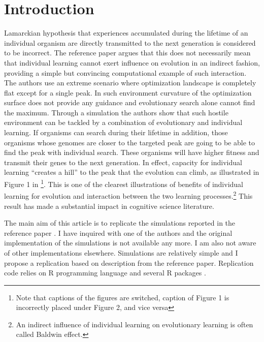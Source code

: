 \documentclass[10pt,a4paper,onecolumn]{article}
\begin{document}
\section{Introduction}\label{introduction}

Lamarckian hypothesis that experiences accumulated during the lifetime
of an individual organism are directly transmitted to the next
generation is considered to be incorrect. The reference paper
\autocite{hinton1987learning} argues that this does not necessarily mean
that individual learning cannot exert influence on evolution in an
indirect fashion, providing a simple but convincing computational
example of such interaction. The authors use an extreme scenario where
optimization landscape is completely flat except for a single peak. In
such environment curvature of the optimization surface does not provide
any guidance and evolutionary search alone cannot find the maximum.
Through a simulation the authors show that such hostile environment can
be tackled by a combination of evolutionary and individual learning. If
organisms can search during their lifetime in addition, those organisms
whose genomes are closer to the targeted peak are going to be able to
find the peak with individual search. These organisms will have higher
fitness and transmit their genes to the next generation. In effect,
capacity for individual learning ``creates a hill'' to the peak that the
evolution can climb, as illustrated in Figure 1 in
\textcite{hinton1987learning}\footnote{Note that captions of the figures
  are switched, caption of Figure 1 is incorrectly placed under Figure
  2, and vice versa}. This is one of the clearest illustrations of
benefits of individual learning for evolution and interaction between
the two learning processes.\footnote{An indirect influence of individual
  learning on evolutionary learning is often called Baldwin effect.}
This result has made a substantial impact in cognitive science
literature.

The main aim of this article is to replicate the simulations reported in
the reference paper \autocite{hinton1987learning}. I have inquired with
one of the authors and the original implementation of the simulations is
not available any more. I am also not aware of other implementations
elsewhere. Simulations are relatively simple and I propose a replication
based on description from the reference paper. Replication code relies
on R programming language \autocite{R} and several R packages
\autocites{ggplot2}{dplyr}{reshape2}{doParallel}{foreach}{doRNG}.
\end{document}
